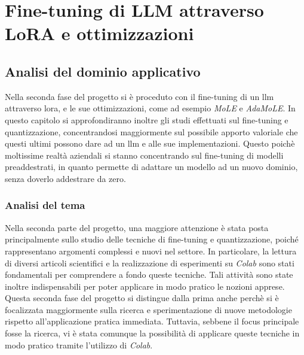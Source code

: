  \chapter{Fine-tuning di LLM attraverso LoRA e ottimizzazioni}
\label{chap:descrizione-stage-2}
\section{Analisi del dominio applicativo}
Nella seconda fase del progetto si è proceduto con il \gls{fine-tuning} di un \gls{llm} attraverso \gls{lora}, e le sue ottimizzazioni, come ad esempio \textit{MoLE} e \textit{AdaMoLE}. In questo capitolo si approfondiranno inoltre gli studi effettuati sul \gls{fine-tuning} e quantizzazione, concentrandosi maggiormente sul possibile apporto valoriale che questi ultimi possono dare ad un \gls{llm} e alle sue implementazioni.
Questo poichè moltissime realtà aziendali si stanno concentrando sul \gls{fine-tuning} di modelli preaddestrati, in quanto permette di adattare un modello ad un nuovo dominio, senza doverlo addestrare da zero.
    \subsection{Analisi del tema}
    Nella seconda parte del progetto, una maggiore attenzione è stata posta principalmente sullo studio delle tecniche di \gls{fine-tuning} e quantizzazione, poiché rappresentano argomenti complessi e nuovi nel settore. In particolare, la lettura di diversi articoli scientifici e la realizzazione di esperimenti su \textit{Colab} sono stati fondamentali per comprendere a fondo queste tecniche. Tali attività sono state inoltre indispensabili per poter applicare in modo pratico le nozioni apprese.
    Questa seconda fase del progetto si distingue dalla prima anche perchè si è focalizzata maggiormente sulla ricerca e sperimentazione di nuove metodologie rispetto all'applicazione pratica immediata. Tuttavia, sebbene il focus principale fosse la ricerca, vi è stata comunque la possibilità di applicare queste tecniche in modo pratico tramite l'utilizzo di \textit{Colab}.



